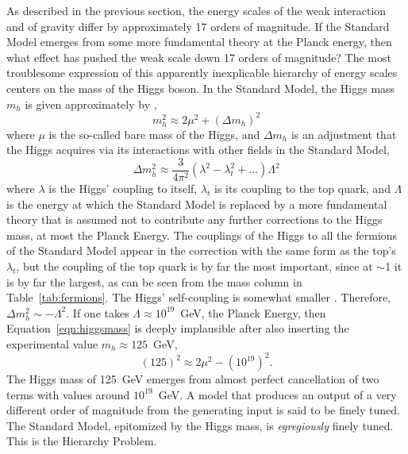   As described in the previous section, the energy scales of the weak interaction and of gravity differ by approximately 17 orders of magnitude.
  If the Standard Model emerges from some more fundamental theory at the Planck energy, then what effect has pushed the weak scale down 17 orders of magnitude?
  The most troublesome expression of this apparently inexplicable hierarchy of energy scales centers on the mass of the Higgs boson.
  In the Standard Model, the Higgs mass $m_h$ is given approximately by \cite{SUSYnaturalness,higgsmass},
  \begin{equation} \label{eqn:higgsmass}
    m_h^2 \approx 2\mu^2 + (\Delta m_h)^2
  \end{equation}
  where $\mu$ is the so-called bare mass of the Higgs, and $\Delta m_h$ is an adjustment that the Higgs acquires via its interactions with other fields in the Standard Model,
  \begin{equation} \label{eqn:masscorrection}
    \Delta m_h^2 \approx \frac{3}{4\pi^2}\left(\lambda^2 - \lambda_t^2 + \ldots\right)\Lambda^2
  \end{equation}
  where $\lambda$ is the Higgs' coupling to itself, $\lambda_t$ is its coupling to the top quark, and $\Lambda$ is the energy at which the Standard Model is replaced by a more fundamental theory that is assumed not to contribute any further corrections to the Higgs mass, at most the Planck Energy.
  The couplings of the Higgs to all the fermions of the Standard Model appear in the correction with the same form as the top's $\lambda_t$, but the coupling of the top quark is by far the most important, since at $\sim$1 it is by far the largest, as can be seen from the mass column in Table~\ref{tab:fermions}.
  The Higgs' self-coupling is somewhat smaller \cite{higgsmass}.
  Therefore, $\Delta m_h^2 \sim -\Lambda^2$.
  If one takes $\Lambda \approx 10^{19}$~GeV, the Planck Energy, then Equation~\ref{eqn:higgsmass} is deeply implausible after also inserting the experimental value $m_h \approx 125$~GeV,
  \begin{equation}
    (125)^2 \approx 2\mu^2 - (10^{19})^2.
  \end{equation}
  The Higgs mass of 125~GeV emerges from almost perfect cancellation of two terms with values around $10^{19}$~GeV.
  A model that produces an output of a very different order of magnitude from the generating input is said to be finely tuned.
  The Standard Model, epitomized by the Higgs mass, is {\it egregiously} finely tuned.
  This is the Hierarchy Problem.

